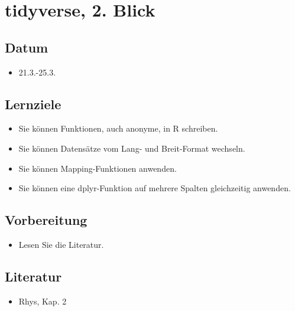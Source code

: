 \documentclass[
]{book}
\providecommand{\tightlist}{%
  \setlength{\itemsep}{0pt}\setlength{\parskip}{0pt}}
\begin{document}
\hypertarget{tidyverse-2.-blick}{%
\section{tidyverse, 2. Blick}\label{tidyverse-2.-blick}}

\hypertarget{datum-1}{%
\subsection{Datum}\label{datum-1}}

\begin{itemize}
\tightlist
\item
  21.3.-25.3.
\end{itemize}

\hypertarget{lernziele-2}{%
\subsection{Lernziele}\label{lernziele-2}}

\begin{itemize}
\tightlist
\item
  Sie können Funktionen, auch anonyme, in R schreiben.
\item
  Sie können Datensätze vom Lang- und Breit-Format wechseln.
\item
  Sie können Mapping-Funktionen anwenden.
\item
  Sie können eine dplyr-Funktion auf mehrere Spalten gleichzeitig anwenden.
\end{itemize}

\hypertarget{vorbereitung-1}{%
\subsection{Vorbereitung}\label{vorbereitung-1}}

\begin{itemize}
\tightlist
\item
  Lesen Sie die Literatur.
\end{itemize}

\hypertarget{literatur-2}{%
\subsection{Literatur}\label{literatur-2}}

\begin{itemize}
\tightlist
\item
  Rhys, Kap. 2
\end{itemize}
\end{document}
